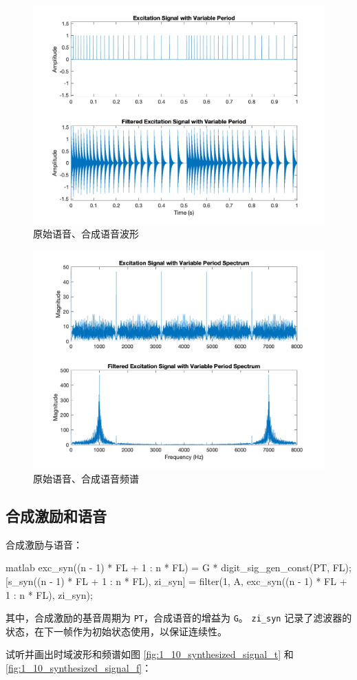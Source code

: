 \documentclass[a4paper]{article}  %
\begin{document}
\begin{figure}[ht]
    \centering
    \includegraphics[width=.6\textwidth]{asserts/1_9_signal_t.png}
    \caption{
        原始语音、合成语音波形
    }\label{fig:1_9_signal_t}
\end{figure}

\begin{figure}[ht]
    \centering
    \includegraphics[width=.6\textwidth]{asserts/1_9_signal_f.png}
    \caption{
        原始语音、合成语音频谱
    }\label{fig:1_9_signal_f}
\end{figure}

\subsection{合成激励和语音}

合成激励与语音：
\begin{codeblock}{matlab}
exc_syn((n - 1) * FL + 1 : n * FL) = G * digit_sig_gen_const(PT, FL);
[s_syn((n - 1) * FL + 1 : n * FL), zi_syn] = filter(1, A, exc_syn((n - 1) * FL + 1 : n * FL), zi_syn);
\end{codeblock}

其中，合成激励的基音周期为 \texttt{PT}，合成语音的增益为 \texttt{G}。
\texttt{zi\_syn} 记录了滤波器的状态，在下一帧作为初始状态使用，以保证连续性。

试听并画出时域波形和频谱如图 \ref{fig:1_10_synthesized_signal_t} 和 \ref{fig:1_10_synthesized_signal_f}：
\end{document}
